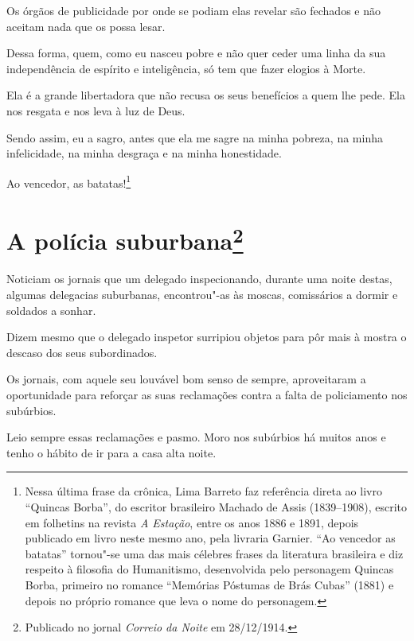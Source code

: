 Os órgãos de publicidade por onde se podiam elas revelar são fechados e
não aceitam nada que os possa lesar.

Dessa forma, quem, como eu nasceu pobre e não quer ceder uma linha da
sua independência de espírito e inteligência, só tem que fazer elogios à
Morte.

Ela é a grande libertadora que não recusa os seus benefícios a quem lhe
pede. Ela nos resgata e nos leva à luz de Deus.

Sendo assim, eu a sagro, antes que ela me sagre na minha pobreza, na
minha infelicidade, na minha desgraça e na minha honestidade.

Ao vencedor, as batatas!\footnote{Nessa última frase da crônica, Lima
  Barreto faz referência direta ao livro ``Quincas Borba'', do escritor
  brasileiro Machado de Assis (1839--1908), escrito em folhetins na
  revista \emph{A Estação}, entre os anos 1886 e 1891, depois publicado
  em livro neste mesmo ano, pela livraria Garnier. ``Ao vencedor as
  batatas'' tornou"-se uma das mais célebres frases da literatura
  brasileira e diz respeito à filosofia do Humanitismo, desenvolvida
  pelo personagem Quincas Borba, primeiro no romance ``Memórias Póstumas
  de Brás Cubas'' (1881) e depois no próprio romance que leva o nome do
  personagem.}


\chapter[A polícia suburbana]{A polícia suburbana\footnote[*]{Publicado no jornal \emph{Correio da Noite} em 28/12/1914.}}

Noticiam os jornais que um delegado inspecionando, durante uma noite
destas, algumas delegacias suburbanas, encontrou"-as às moscas,
comissários a dormir e soldados a sonhar.

Dizem mesmo que o delegado inspetor surripiou objetos para pôr mais à
mostra o descaso dos seus subordinados.

Os jornais, com aquele seu louvável bom senso de sempre, aproveitaram a
oportunidade para reforçar as suas reclamações contra a falta de
policiamento nos subúrbios.

Leio sempre essas reclamações e pasmo. Moro nos subúrbios há muitos anos
e tenho o hábito de ir para a casa alta noite.

